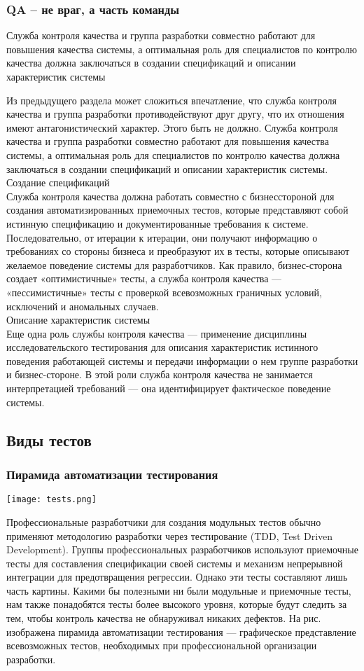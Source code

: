 \documentclass{../industrial-development}
\begin{document}
\begin{frame} \frametitle{QA – не враг, а часть команды}
  \begin{block}{}
	Служба контроля качества и группа разработки совместно работают для повышения качества системы, а оптимальная роль для специалистов по контролю качества должна заключаться в создании спецификаций и описании характеристик системы
  \end{block}
\end{frame}
\lecturenotes
Из предыдущего раздела может сложиться впечатление, что служба контроля качества и группа разработки противодействуют друг другу, что их отношения имеют антагонистический характер. Этого быть не должно. Служба контроля качества и группа разработки совместно работают для повышения качества системы, а оптимальная роль для специалистов по контролю качества должна заключаться в создании спецификаций и описании характеристик системы.\\
Создание спецификаций\\
Служба контроля качества должна работать совместно с бизнесстороной для создания автоматизированных приемочных тестов, которые представляют собой истинную спецификацию и документированные требования к системе. Последовательно, от итерации к итерации, они получают информацию о требованиях со стороны бизнеса и преобразуют их в тесты, которые описывают желаемое поведение системы для разработчиков. Как правило, бизнес-сторона создает «оптимистичные» тесты, а служба контроля качества — «пессимистичные» тесты с проверкой всевозможных граничных условий, исключений и аномальных случаев.\\
Описание характеристик системы\\
Еще одна роль службы контроля качества — применение дисциплины исследовательского тестирования для описания характеристик истинного поведения работающей системы и передачи информации о нем группе разработки и бизнес-стороне. В этой роли служба контроля качества не занимается интерпретацией требований — она идентифицирует фактическое поведение системы.

\subsection{Виды тестов}
\begin{frame} \frametitle{Пирамида автоматизации тестирования}
{\texttt{[image: tests.png]}}
\end{frame}
\lecturenotes
Профессиональные разработчики для создания модульных тестов обычно применяют методологию разработки через тестирование (TDD, Test Driven Development). Группы профессиональных разработчиков используют приемочные тесты для составления спецификации своей системы и механизм непрерывной интеграции для предотвращения регрессии. Однако эти тесты составляют лишь часть картины. Какими бы полезными ни были модульные и приемочные тесты, нам также понадобятся тесты более высокого уровня, которые будут следить за тем, чтобы контроль качества не обнаруживал никаких
дефектов. На рис. изображена пирамида автоматизации тестирования — графическое представление всевозможных тестов, необходимых при профессиональной организации разработки.
\end{document}
